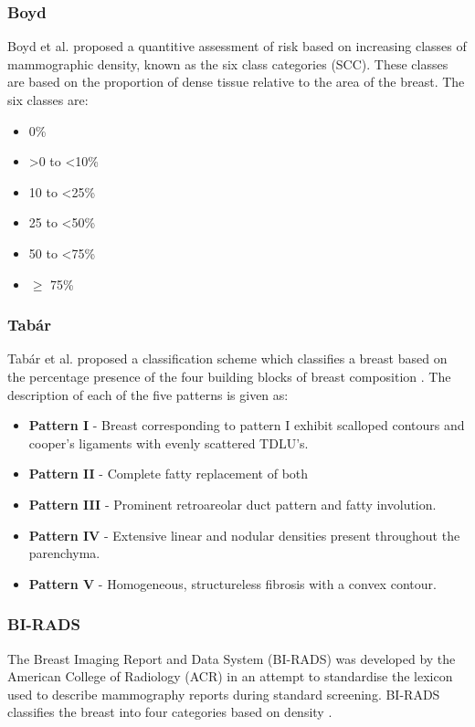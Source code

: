 \subsubsection{Boyd}
Boyd et al. \cite{boyd1995quantitative} proposed a quantitive assessment of risk based on increasing classes of mammographic density, known as the six class categories (SCC). These classes are based on the proportion of dense tissue relative to the area of the breast. The six classes are:

\begin{itemize}
	\item 0\%
	\item \textgreater 0 to \textless 10\% 
	\item 10 to \textless 25\% 
	\item 25 to \textless 50\%
	\item 50 to \textless 75\%
	\item $\geq$ 75\%
\end{itemize}

\subsubsection{Tab\'{a}r}
Tab\'{a}r et al. \cite{gram1997tabar} proposed a classification scheme which classifies a breast based on the percentage presence of the four building blocks of breast composition \cite{gram1997tabar, tabar2005breast}. The description of each of the five patterns is given as:

\begin{itemize}
	\item \textbf{Pattern I} - Breast corresponding to pattern I exhibit scalloped contours and cooper's ligaments with evenly scattered TDLU's.
	\item \textbf{Pattern II} - Complete fatty replacement of both
	\item \textbf{Pattern III} - Prominent retroareolar duct pattern and fatty involution.
	\item \textbf{Pattern IV} - Extensive linear and nodular densities present throughout the parenchyma.
	\item \textbf{Pattern V} - Homogeneous, structureless fibrosis with a convex contour.
\end{itemize}

\subsubsection{BI-RADS}
The Breast Imaging Report and Data System (BI-RADS) \cite{d1998illustrated, balleyguier2007birads} was developed by the American College of Radiology (ACR) in an attempt to standardise the lexicon used to describe mammography reports during standard screening. BI-RADS classifies the breast into four categories based on density \cite{balleyguier2007birads}.

